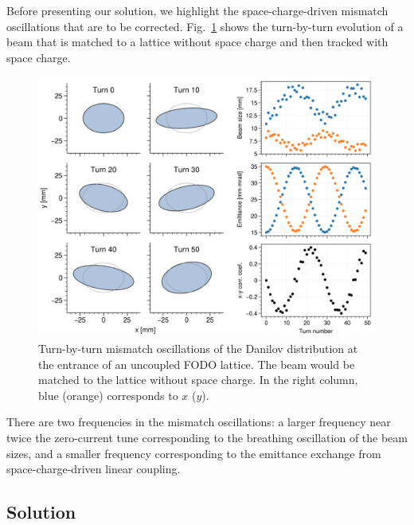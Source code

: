 Before presenting our solution, we highlight the space-charge-driven mismatch oscillations that are to be corrected. Fig.~\ref{fig:fodo_mismatch_tbt} shows the turn-by-turn evolution of a beam that is matched to a lattice without space charge and then tracked with space charge. 
%
\begin{figure}[!p]
    \centering
    \includegraphics[width=\textwidth]{Images/chapter2/fodo_mismatch_tbt.png}
    \caption{Turn-by-turn mismatch oscillations of the Danilov distribution at the entrance of an uncoupled FODO lattice. The beam would be matched to the lattice without space charge. In the right column, blue (orange) corresponds to $x$ ($y$).}
    \label{fig:fodo_mismatch_tbt}
\end{figure}
%
There are two frequencies in the mismatch oscillations: a larger frequency near twice the zero-current tune corresponding to the breathing oscillation of the beam sizes, and a smaller frequency corresponding to the emittance exchange from space-charge-driven linear coupling. 


\subsection{Solution}

